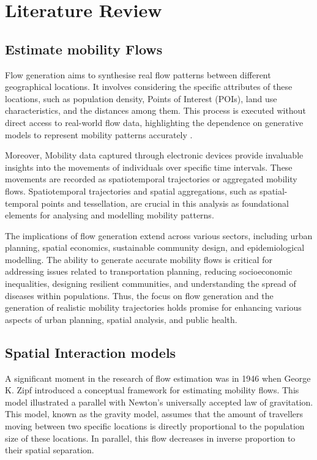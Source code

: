 \chapter{Literature Review}
\label{chapterlabel2}
    \section{Estimate mobility Flows} 

     Flow generation aims to synthesise real flow patterns between different geographical locations. It involves considering the specific attributes of these locations, such as population density, Points of Interest (POIs), land use characteristics, and the distances among them. This process is executed without direct access to real-world flow data, highlighting the dependence on generative models to represent mobility patterns accurately \citep{lucaSurveyDeepLearning2021}.
    
    Moreover, Mobility data captured through electronic devices provide invaluable insights into the movements of individuals over specific time intervals\citep{lucaSurveyDeepLearning2021}. These movements are recorded as spatiotemporal trajectories or aggregated mobility flows. Spatiotemporal trajectories and spatial aggregations, such as spatial-temporal points and tessellation, are crucial in this analysis as foundational elements for analysing and modelling mobility patterns\citep{lucaSurveyDeepLearning2021, siminiDeepGravityModel2021}.
    
    The implications of flow generation extend across various sectors, including urban planning, spatial economics, sustainable community design, and epidemiological modelling. The ability to generate accurate mobility flows is critical for addressing issues related to transportation planning, reducing socioeconomic inequalities, designing resilient communities, and understanding the spread of diseases within populations\citep{lucaSurveyDeepLearning2021}. Thus, the focus on flow generation and the generation of realistic mobility trajectories holds promise for enhancing various aspects of urban planning, spatial analysis, and public health.
      
    \section{Spatial Interaction models}

    A significant moment in the research of flow estimation was in 1946 when George K. Zipf introduced a conceptual framework for estimating mobility flows\citep{siminiDeepGravityModel2021, wilkinsonSpatialInteractionModels2023}. This model illustrated a parallel with Newton's universally accepted law of gravitation. This model, known as the gravity model, assumes that the amount of travellers moving between two specific locations is directly proportional to the population size of these locations. In parallel, this flow decreases in inverse proportion to their spatial separation\citep{wilsonFamilySpatialInteraction1971b}.
        
